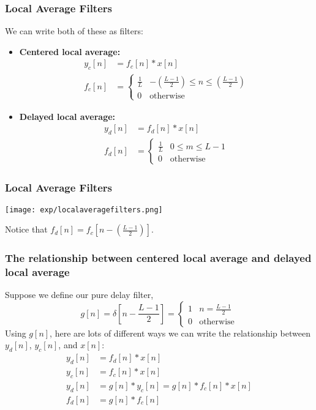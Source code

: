 \documentclass{beamer}
\begin{document}
\begin{frame}
  \frametitle{Local Average Filters}

  We can write both of these as filters:
  \begin{itemize}
  \item {\bf Centered local average:}
    \begin{align*}
      y_c[n] &= f_c[n]\ast x[n]\\
      f_c[n] &= \begin{cases} \frac{1}{L}& -\left(\frac{L-1}{2}\right)\le n\le\left(\frac{L-1}{2}\right)\\
        0&\mbox{otherwise}\end{cases}
    \end{align*}
  \item {\bf Delayed local average:}
    \begin{align*}
      y_d[n] &= f_d[n]\ast x[n]\\
      f_d[n] &= \begin{cases} \frac{1}{L}& 0\le m\le L-1\\
        0&\mbox{otherwise}\end{cases}
    \end{align*}
  \end{itemize}
\end{frame}

\begin{frame}
  \frametitle{Local Average Filters}
  \centerline{\texttt{[image: exp/localaveragefilters.png]}}
  Notice that $f_d[n]=f_c\left[n-\left(\frac{L-1}{2}\right)\right]$.
\end{frame}  

\begin{frame}
  \frametitle{The relationship between centered local average and delayed local average}

  Suppose we define our pure delay filter,
  \[
  g[n]=\delta\left[n-\frac{L-1}{2}\right] = \begin{cases}
  1 & n=\frac{L-1}{2}\\
  0 & \mbox{otherwise}
  \end{cases}
  \]
  Using $g[n]$, here are  lots of different ways we can write the relationship
  between $y_d[n]$, $y_c[n]$, and $x[n]$:
  \begin{align*}
    y_d[n] &= f_d[n]\ast x[n]\\
    y_c[n] &= f_c[n]\ast x[n]\\
    y_d[n] &= g[n]\ast y_c[n] = g[n]\ast f_c[n]\ast x[n]\\
    f_d[n] &= g[n]\ast f_c[n]
  \end{align*}
\end{frame}
  
\end{document}
